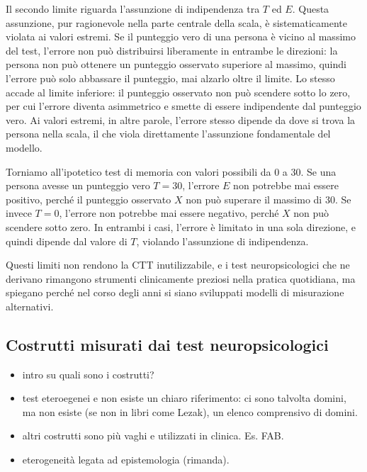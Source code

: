 \documentclass[
  italian,
  letterpaper,
  paper=A4,
  headinclude=on,
  footinclude=on,
  12pt]{scrbook}
\providecommand{\tightlist}{%
  \setlength{\itemsep}{0pt}\setlength{\parskip}{0pt}}
\begin{document}
Il secondo limite riguarda l'assunzione di indipendenza tra \(T\) ed
\(E\). Questa assunzione, pur ragionevole nella parte centrale della
scala, è sistematicamente violata ai valori estremi. Se il punteggio
vero di una persona è vicino al massimo del test, l'errore non può
distribuirsi liberamente in entrambe le direzioni: la persona non può
ottenere un punteggio osservato superiore al massimo, quindi l'errore
può solo abbassare il punteggio, mai alzarlo oltre il limite. Lo stesso
accade al limite inferiore: il punteggio osservato non può scendere
sotto lo zero, per cui l'errore diventa asimmetrico e smette di essere
indipendente dal punteggio vero. Ai valori estremi, in altre parole,
l'errore stesso dipende da dove si trova la persona nella scala, il che
viola direttamente l'assunzione fondamentale del modello.

Torniamo all'ipotetico test di memoria con valori possibili da 0 a 30.
Se una persona avesse un punteggio vero \(T=30\), l'errore \(E\) non
potrebbe mai essere positivo, perché il punteggio osservato \(X\) non
può superare il massimo di 30. Se invece \(T=0\), l'errore non potrebbe
mai essere negativo, perché \(X\) non può scendere sotto zero. In
entrambi i casi, l'errore è limitato in una sola direzione, e quindi
dipende dal valore di \(T\), violando l'assunzione di indipendenza.

Questi limiti non rendono la CTT inutilizzabile, e i test
neuropsicologici che ne derivano rimangono strumenti clinicamente
preziosi nella pratica quotidiana, ma spiegano perché nel corso degli
anni si siano sviluppati modelli di misurazione alternativi.

\subsection{Costrutti misurati dai test
neuropsicologici}\label{costrutti-misurati-dai-test-neuropsicologici}

\begin{itemize}
\tightlist
\item
  intro su quali sono i costrutti?
\item
  test eteroegenei e non esiste un chiaro riferimento: ci sono talvolta
  domini, ma non esiste (se non in libri come Lezak), un elenco
  comprensivo di domini.
\item
  altri costrutti sono più vaghi e utilizzati in clinica. Es. FAB.
\item
  eterogeneità legata ad epistemologia (rimanda).
\end{itemize}
\end{document}
